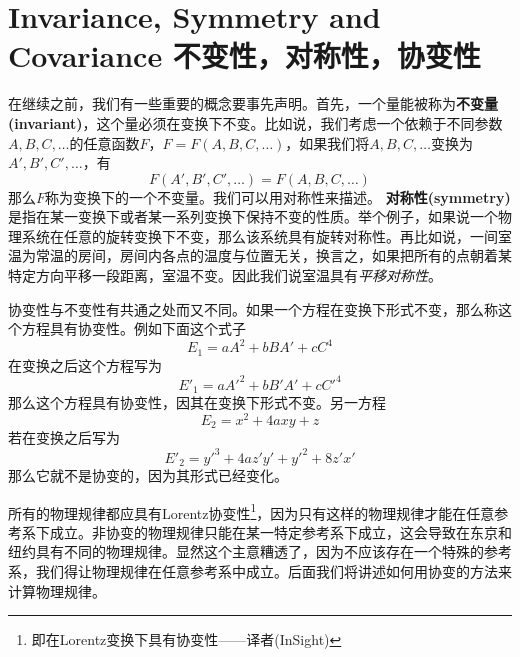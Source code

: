 \section[不变性，对称性，协变性]{Invariance, Symmetry and Covariance 不变性，对称性，协变性}
在继续之前，我们有一些重要的概念要事先声明。首先，一个量能被称为{\bf{不变量(invariant)}}，这个量必须在变换下不变。比如说，我们考虑一个依赖于不同参数$A,B,C,\dots$的任意函数$ F$，$F=F(A,B,C,\dots)$，如果我们将$A,B,C,\dots$变换为$A',B',C',\dots$，有
\begin{equation}\label{equ2.37}
  F(A',B',C',\dots)=F(A,B,C,\dots)
\end{equation}
那么$F$称为变换下的一个不变量。我们可以用对称性来描述。
{\bf{对称性(symmetry)}}是指在某一变换下或者某一系列变换下保持不变的性质。举个例子，如果说一个物理系统在任意的旋转变换下不变，那么该系统具有旋转对称性。再比如说，一间室温为常温的房间，房间内各点的温度与位置无关，换言之，如果把所有的点朝着某特定方向平移一段距离，室温不变。因此我们说室温具有{\it{平移对称性}}。

协变性与不变性有共通之处而又不同。如果一个方程在变换下形式不变，那么称这个方程具有协变性。例如下面这个式子
\[
E_1=a A^2+bBA'+cC^4
\]
在变换之后这个方程写为
\[
E'_1=a A'^2+bB'A'+cC'^4
\]
那么这个方程具有协变性，因其在变换下形式不变。另一方程
\[
E_2=x^2+4axy+z
\]
若在变换之后写为
\[
E'_2=y'^3+4az'y'+y'^2+8z'x'
\]
那么它就不是协变的，因为其形式已经变化。

所有的物理规律都应具有Lorentz协变性\footnote{即在Lorentz变换下具有协变性——译者(InSight)}，因为只有这样的物理规律才能在任意参考系下成立。非协变的物理规律只能在某一特定参考系下成立，这会导致在东京和纽约具有不同的物理规律。显然这个主意糟透了，因为不应该存在一个特殊的参考系，我们得让物理规律在任意参考系中成立。后面我们将讲述如何用协变的方法来计算物理规律。

